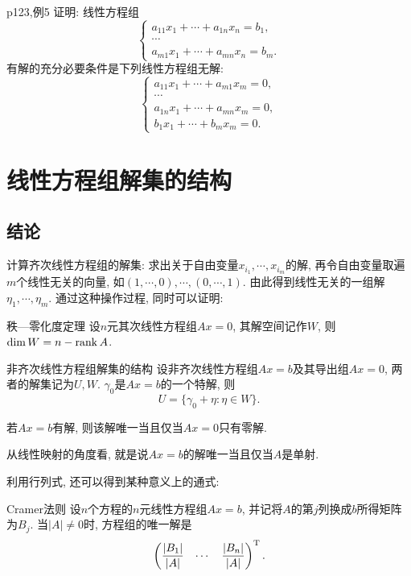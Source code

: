 \begin{example}{p123,例5}
	证明: 线性方程组$$\begin{cases}
		a_{11}x_1+\cdots +a_{1n}x_n=b_1, \\
		\cdots \\
		a_{m1}x_1+\cdots +a_{mn}x_n=b_m.
	\end{cases}$$
	有解的充分必要条件是下列线性方程组无解: $$\begin{cases}
		a_{11}x_1+\cdots +a_{m1}x_m=0, \\
		\cdots \\
		a_{1n}x_1+\cdots +a_{mn}x_m=0, \\
		b_1x_1 + \cdots + b_mx_m=0. 
	\end{cases}$$
\end{example}

\section{线性方程组解集的结构}

\subsection*{结论}

计算齐次线性方程组的解集: 求出关于自由变量$x_{i_1},\cdots ,x_{i_m}$的解, 再令自由变量取遍$m$个线性无关的向量, 如$(1,\cdots ,0),\cdots ,(0,\cdots ,1)$. 由此得到线性无关的一组解$\eta _1,\cdots ,\eta _m$. 通过这种操作过程, 同时可以证明: 

\begin{theorem}{秩—零化度定理}
	设$n$元其次线性方程组$Ax=0$, 其解空间记作$W$, 则$\dim W = n-\operatorname{rank} A$. 
\end{theorem}

\begin{theorem}{非齐次线性方程组解集的结构}
	设非齐次线性方程组$Ax=b$及其导出组$Ax=0$, 两者的解集记为$U,W$. $\gamma _0$是$Ax=b$的一个特解, 则$$U=\{ \gamma _0 + \eta : \eta \in W \}. $$
\end{theorem}

\begin{corollary}{}
	若$Ax=b$有解, 则该解唯一当且仅当$Ax=0$只有零解. 
\end{corollary}
\begin{remark}
	从线性映射的角度看, 就是说$Ax=b$的解唯一当且仅当$A$是单射. 
\end{remark}

利用行列式, 还可以得到某种意义上的通式: 

\begin{theorem}{Cramer法则}
	设$n$个方程的$n$元线性方程组$Ax=b$, 并记将$A$的第$j$列换成$b$所得矩阵为$B_j$. 当$|A| \neq 0$时, 方程组的唯一解是$$\begin{pmatrix}
		\dfrac{|B_1|}{|A|} & \cdots & \dfrac{|B_n|}{|A|}
	\end{pmatrix}^{\operatorname{T}}.$$
\end{theorem}

